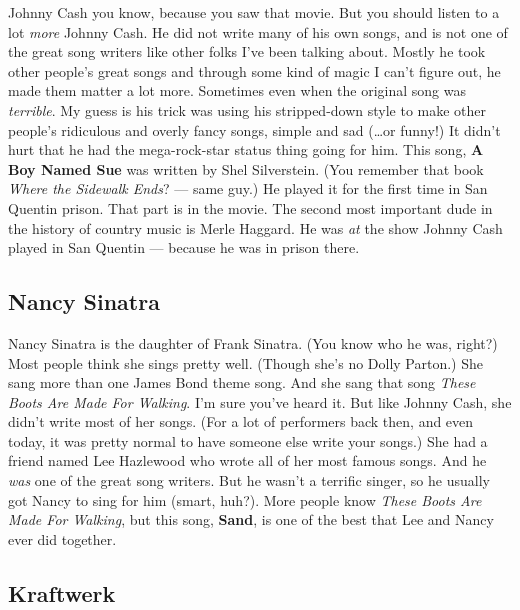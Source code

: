 \documentclass[letterpaper,]{article}
\begin{document}
Johnny Cash you know, because you saw that movie. But you should listen
to a lot \emph{more} Johnny Cash. He did not write many of his own
songs, and is not one of the great song writers like other folks I've
been talking about. Mostly he took other people's great songs and
through some kind of magic I can't figure out, he made them matter a lot
more. Sometimes even when the original song was \emph{terrible}. My
guess is his trick was using his stripped-down style to make other
people's ridiculous and overly fancy songs, simple and sad (\ldots{}or
funny!) It didn't hurt that he had the mega-rock-star status thing going
for him. This song, \textbf{A Boy Named Sue} was written by Shel
Silverstein. (You remember that book \emph{Where the Sidewalk Ends}? ---
same guy.) He played it for the first time in San Quentin prison. That
part is in the movie. The second most important dude in the history of
country music is Merle Haggard. He was \emph{at} the show Johnny Cash
played in San Quentin --- because he was in prison there.

\hypertarget{nancy-sinatra}{%
\subsection{Nancy Sinatra}\label{nancy-sinatra}}

Nancy Sinatra is the daughter of Frank Sinatra. (You know who he was,
right?) Most people think she sings pretty well. (Though she's no Dolly
Parton.) She sang more than one James Bond theme song. And she sang that
song \emph{These Boots Are Made For Walking}. I'm sure you've heard it.
But like Johnny Cash, she didn't write most of her songs. (For a lot of
performers back then, and even today, it was pretty normal to have
someone else write your songs.) She had a friend named Lee Hazlewood who
wrote all of her most famous songs. And he \emph{was} one of the great
song writers. But he wasn't a terrific singer, so he usually got Nancy
to sing for him (smart, huh?). More people know \emph{These Boots Are
Made For Walking}, but this song, \textbf{Sand}, is one of the best that
Lee and Nancy ever did together.

\hypertarget{kraftwerk}{%
\subsection{Kraftwerk}\label{kraftwerk}}
\end{document}
